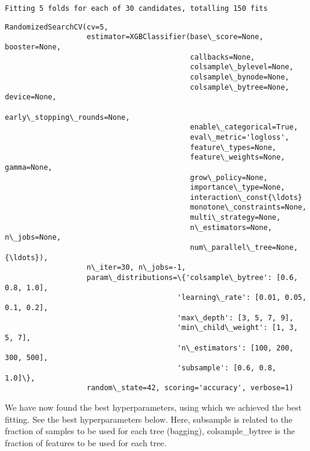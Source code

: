 \documentclass[11pt]{article}
\makeatletter
\newcommand{\boxspacing}{\kern\kvtcb@left@rule\kern\kvtcb@boxsep}
\newcommand{\prompt}[4]{
        {\ttfamily\llap{{\color{#2}[#3]:\hspace{3pt}#4}}\vspace{-\baselineskip}}
    }
\makeatother
\begin{document}
    \begin{Verbatim}[commandchars=\\\{\}]
Fitting 5 folds for each of 30 candidates, totalling 150 fits
    \end{Verbatim}

            \begin{tcolorbox}[breakable, size=fbox, boxrule=.5pt, pad at break*=1mm, opacityfill=0]
\prompt{Out}{outcolor}{23}{\boxspacing}
\begin{Verbatim}[commandchars=\\\{\}]
RandomizedSearchCV(cv=5,
                   estimator=XGBClassifier(base\_score=None, booster=None,
                                           callbacks=None,
                                           colsample\_bylevel=None,
                                           colsample\_bynode=None,
                                           colsample\_bytree=None, device=None,
                                           early\_stopping\_rounds=None,
                                           enable\_categorical=True,
                                           eval\_metric='logloss',
                                           feature\_types=None,
                                           feature\_weights=None, gamma=None,
                                           grow\_policy=None,
                                           importance\_type=None,
                                           interaction\_const{\ldots}
                                           monotone\_constraints=None,
                                           multi\_strategy=None,
                                           n\_estimators=None, n\_jobs=None,
                                           num\_parallel\_tree=None, {\ldots}),
                   n\_iter=30, n\_jobs=-1,
                   param\_distributions=\{'colsample\_bytree': [0.6, 0.8, 1.0],
                                        'learning\_rate': [0.01, 0.05, 0.1, 0.2],
                                        'max\_depth': [3, 5, 7, 9],
                                        'min\_child\_weight': [1, 3, 5, 7],
                                        'n\_estimators': [100, 200, 300, 500],
                                        'subsample': [0.6, 0.8, 1.0]\},
                   random\_state=42, scoring='accuracy', verbose=1)
\end{Verbatim}
\end{tcolorbox}
        
    We have now found the best hyperparameters, using which we achieved the
best fitting. See the best hyperparameters below. Here, subsample is
related to the fraction of samples to be used for each tree (bagging),
colsample\_bytree is the fraction of features to be used for each tree.
\end{document}
